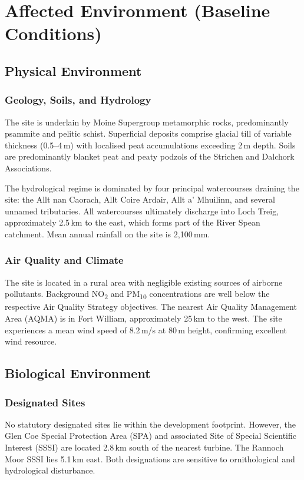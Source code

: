 \section{Affected Environment (Baseline Conditions)}

\subsection{Physical Environment}

\subsubsection{Geology, Soils, and Hydrology}
The site is underlain by Moine Supergroup metamorphic rocks, predominantly psammite and pelitic schist. Superficial deposits comprise glacial till of variable thickness (0.5--4\,m) with localised peat accumulations exceeding 2\,m depth. Soils are predominantly blanket peat and peaty podzols of the Strichen and Dalchork Associations.

The hydrological regime is dominated by four principal watercourses draining the site: the Allt nan Caorach, Allt Coire Ardair, Allt a' Mhuilinn, and several unnamed tributaries. All watercourses ultimately discharge into Loch Treig, approximately 2.5\,km to the east, which forms part of the River Spean catchment. Mean annual rainfall on the site is 2,100\,mm.

\subsubsection{Air Quality and Climate}
The site is located in a rural area with negligible existing sources of airborne pollutants. Background NO\textsubscript{2} and PM\textsubscript{10} concentrations are well below the respective Air Quality Strategy objectives. The nearest Air Quality Management Area (AQMA) is in Fort William, approximately 25\,km to the west. The site experiences a mean wind speed of 8.2\,m/s at 80\,m height, confirming excellent wind resource.

\subsection{Biological Environment}

\subsubsection{Designated Sites}
No statutory designated sites lie within the development footprint. However, the Glen Coe Special Protection Area (SPA) and associated Site of Special Scientific Interest (SSSI) are located 2.8\,km south of the nearest turbine. The Rannoch Moor SSSI lies 5.1\,km east. Both designations are sensitive to ornithological and hydrological disturbance.

